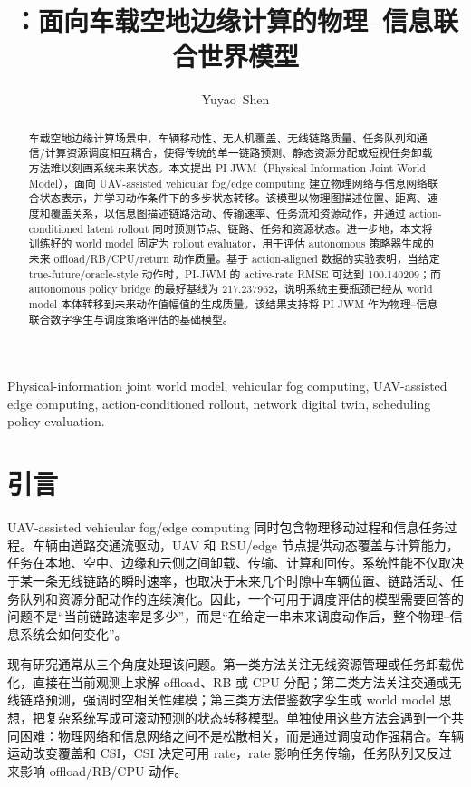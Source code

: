 \documentclass[letterpaper,journal]{IEEEtran}
\title{\pjwm{}：面向车载空地边缘计算的物理--信息联合世界模型}
\author{Yuyao~Shen}
\newcommand{\pjwm}{PI-JWM}
\begin{document}
\maketitle

\begin{abstract}
车载空地边缘计算场景中，车辆移动性、无人机覆盖、无线链路质量、任务队列和通信/计算资源调度相互耦合，使得传统的单一链路预测、静态资源分配或短视任务卸载方法难以刻画系统未来状态。本文提出 \pjwm{}（Physical-Information Joint World Model），面向 UAV-assisted vehicular fog/edge computing 建立物理网络与信息网络联合状态表示，并学习动作条件下的多步状态转移。该模型以物理图描述位置、距离、速度和覆盖关系，以信息图描述链路活动、传输速率、任务流和资源动作，并通过 action-conditioned latent rollout 同时预测节点、链路、任务和资源状态。进一步地，本文将训练好的 world model 固定为 rollout evaluator，用于评估 autonomous 策略器生成的未来 offload/RB/CPU/return 动作质量。基于 action-aligned 数据的实验表明，当给定 true-future/oracle-style 动作时，\pjwm{} 的 active-rate RMSE 可达到 100.140209；而 autonomous policy bridge 的最好基线为 217.237962，说明系统主要瓶颈已经从 world model 本体转移到未来动作值幅值的生成质量。该结果支持将 \pjwm{} 作为物理--信息联合数字孪生与调度策略评估的基础模型。
\end{abstract}

\begin{IEEEkeywords}
Physical-information joint world model, vehicular fog computing, UAV-assisted edge computing, action-conditioned rollout, network digital twin, scheduling policy evaluation.
\end{IEEEkeywords}

\section{引言}

UAV-assisted vehicular fog/edge computing 同时包含物理移动过程和信息任务过程。车辆由道路交通流驱动，UAV 和 RSU/edge 节点提供动态覆盖与计算能力，任务在本地、空中、边缘和云侧之间卸载、传输、计算和回传。系统性能不仅取决于某一条无线链路的瞬时速率，也取决于未来几个时隙中车辆位置、链路活动、任务队列和资源分配动作的连续演化。因此，一个可用于调度评估的模型需要回答的问题不是“当前链路速率是多少”，而是“在给定一串未来调度动作后，整个物理--信息系统会如何变化”。

现有研究通常从三个角度处理该问题。第一类方法关注无线资源管理或任务卸载优化，直接在当前观测上求解 offload、RB 或 CPU 分配；第二类方法关注交通或无线链路预测，强调时空相关性建模；第三类方法借鉴数字孪生或 world model 思想，把复杂系统写成可滚动预测的状态转移模型。单独使用这些方法会遇到一个共同困难：物理网络和信息网络之间不是松散相关，而是通过调度动作强耦合。车辆运动改变覆盖和 CSI，CSI 决定可用 rate，rate 影响任务传输，任务队列又反过来影响 offload/RB/CPU 动作。
\end{document}
